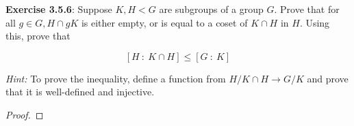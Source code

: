 \documentclass[a4paper]{article}
\begin{document}
\begin{myparindent}{0pt}
\textbf{Exercise 3.5.6}:
Suppose $K, H < G$ are subgroups of a group $G$. Prove that for all $g \in G,
H \cap gK$ is either empty, or is equal to a coset of $K \cap H$ in $H$. Using
this, prove that

\[ [H ~: ~K \cap H] \le [G ~: ~K] \]

\textit{Hint:} To prove the inequality, define a function from $H/K \cap H
\rightarrow G/K$ and prove that it is well-defined and injective.
\begin{proof}
\end{proof}

\end{myparindent}
\end{document}
